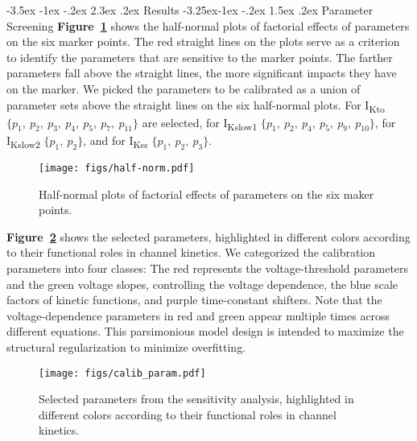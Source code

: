\documentclass[11pt]{article}
\makeatletter
\renewcommand\section{\@startsection {section}{1}{\z@}%
                                   {-3.5ex \@plus -1ex \@minus -.2ex}%
                                   {2.3ex \@plus.2ex}%
                                   {\normalfont\fontfamily{phv}\fontsize{16}{19}\bfseries}}
\renewcommand\subsection{\@startsection{subsection}{2}{\z@}%
                                     {-3.25ex\@plus -1ex \@minus -.2ex}%
                                     {1.5ex \@plus .2ex}%
                                     {\normalfont\fontfamily{phv}\fontsize{14}{17}\bfseries}}
\makeatother
\begin{document}
\section{Results}
\subsection{Parameter Screening}
\textbf{Figure~\ref{fig:half-norm}} shows the half-normal plots of factorial effects of parameters on the six marker points. The red straight lines on the plots serve as a criterion to identify the parameters that are sensitive to the marker points. The farther parameters fall above the straight lines, the more significant impacts they have on the marker. We picked the parameters to be calibrated as a union of parameter sets above the straight lines on the six half-normal plots. For I\textsubscript{Kto} $\{p_{1},\ p_{2},\ p_{3},\ p_{4},\ p_{5},\ p_{7},\ p_{11}\}$ are selected, for I\textsubscript{Kslow1} $\{p_{1},\ p_{2},\ p_{4},\ p_{5},\ p_{9},\ p_{10}\}$, for I\textsubscript{Kslow2} $\{p_{1},\ p_{2}\}$, and for I\textsubscript{Kss} $\{p_{1},\ p_{2},\ p_{3}\}$. 
\begin{figure}
    \centering
    \texttt{[image: figs/half-norm.pdf]}
    \caption{Half-normal plots of factorial effects of parameters on the six maker points.}
    \label{fig:half-norm}
\end{figure}

\textbf{Figure~\ref{fig:calib_param}} shows the selected parameters, highlighted in different colors according to their functional roles in channel kinetics. We categorized the calibration parameters into four classes: The red represents the voltage-threshold parameters and the green voltage slopes, controlling the voltage dependence, the blue scale factors of kinetic functions, and purple time-constant shifters. Note that the voltage-dependence parameters in red and green appear multiple times across different equations. This parsimonious model design is intended to maximize the structural regularization to minimize overfitting.
\begin{figure}[!ht]
    \centering
    \texttt{[image: figs/calib\_param.pdf]}
    \caption{Selected parameters from the sensitivity analysis, highlighted in different colors according to their functional roles in channel kinetics.}
    \label{fig:calib_param}
\end{figure}
\end{document}
